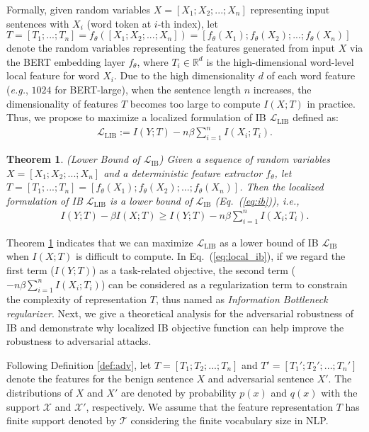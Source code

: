 \documentclass{article} \usepackage{iclr2021_conference,times}
\newcommand{\R}{\mathbb{R}}
\newtheorem{theorem}{Theorem}[section]
\theoremstyle{definition}
\theoremstyle{remark}
\newcommand{\modified}[1]{{\color{black}{#1}}}
\begin{document}
Formally, given random variables  $X=[X_1; X_2; ...; X_n]$ representing input sentences with $X_i$ (word token at $i$-th index), let $T=[T_1; ...; T_n]=f_\theta([X_1; X_2; ...; X_n]) = [f_\theta(X_1); f_\theta(X_2); ...; f_\theta(X_n)]$ denote the random variables representing the features generated from input $X$ via the BERT embedding layer $f_\theta$, where $T_i \in \R^{d}$ is the high-dimensional word-level local feature for word $X_i$. Due to the high dimensionality $d$ of each word feature (\emph{e.g.}, $1024$ for BERT-large), when the sentence length $n$ increases, the dimensionality of features $T$ becomes too large to compute $I(X;T)$ in practice. Thus, we propose to maximize a localized formulation of IB $\mathcal{L}_{\text{LIB}}$ defined as:
\begin{align} 
\label{eq:local_ib}
  \mathcal{L}_{\text{LIB}} := I(Y; T) - n\beta \sum_{i=1}^{n} I(X_i; T_i).
\end{align}
\begin{theorem} (Lower Bound of $\mathcal{L}_{\text{IB}}$) Given a sequence of random variables $X=[X_1; X_2; ...; X_n]$ and a deterministic feature extractor $f_\theta$, let $T=[T_1; ...; T_n] = [f_\theta(X_1); f_\theta(X_2); ...; f_\theta(X_n)]$. Then the localized formulation of IB $\mathcal{L}_{\text{LIB}}$ is a lower bound of $\mathcal{L}_{\text{IB}}$ (Eq.~(\ref{eq:ib})), i.e.,
\label{thm:local}
\begin{align}
     I(Y; T) - \beta I(X; T) \ge I(Y; T) - n\beta \sum_{i=1}^{n} I(X_i; T_i).
\end{align}
\end{theorem} Theorem \ref{thm:local} indicates that we can maximize \modified{the localized formulation of} $\mathcal{L}_{\text{LIB}}$ as a lower bound of IB $\mathcal{L}_{\text{IB}}$ when $I(X;T)$ is difficult to compute. In Eq.~(\ref{eq:local_ib}), if we regard the first term ($I(Y;T)$) as a task-related objective, the second term ($-n\beta \sum_{i=1}^{n} I(X_i; T_i)$) can be considered as a regularization term to constrain the complexity of representation $T$, thus named as \textit{Information Bottleneck regularizer}.  Next, we give a theoretical analysis for the adversarial robustness of IB and demonstrate why localized IB objective function can help improve the robustness to adversarial attacks. 

Following Definition \ref{def:adv}, let $T=[T_1;T_2;...;T_n]$ and $T'=[T_1';T_2';...;T_n']$ denote the features for the benign sentence $X$ and adversarial sentence $X'$. The distributions of $X$ and $X'$ are denoted by probability $p(x)$ and $q(x)$ with the support $\mathcal{X}$ and $\mathcal{X'}$, respectively. 
We assume that the feature representation $T$ has finite support denoted by $\mathcal{T}$ considering the finite vocabulary size in NLP.
\end{document}
